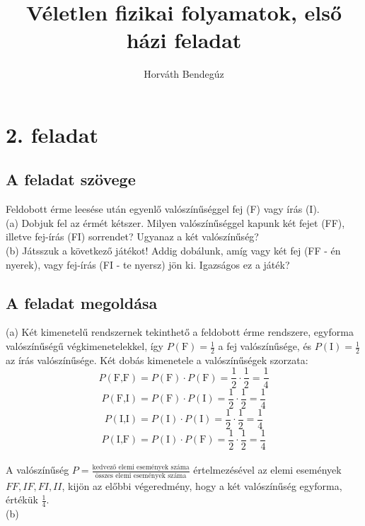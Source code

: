 \documentclass[12pt]{article}
\title{Véletlen fizikai folyamatok, első házi feladat}
\author{Horváth Bendegúz}
\begin{document}
 
 
\maketitle

\section*{2. feladat}
\subsection*{A feladat szövege}
Feldobott érme leesése után egyenlő valószínűséggel fej (F) vagy írás (I).
\\
(a) Dobjuk fel az érmét kétszer. Milyen valószínűséggel kapunk két fejet (FF), illetve fej-írás (FI) sorrendet? Ugyanaz a két valószínűség?
\\ 
(b) Játsszuk a következő játékot! Addig dobálunk, amíg vagy két fej (FF - én nyerek), vagy fej-írás (FI - te nyersz) jön ki. Igazságos ez a játék?
\subsection*{A feladat megoldása}
(a) Két kimenetelű rendszernek tekinthető a feldobott érme rendszere, egyforma valószínűségű végkimenetelekkel, így $P(\text{F}) = \frac{1}{2} $ a fej valószínűsége, és  $P(\text{I}) = \frac{1}{2} $ az írás valószínűsége. Két dobás kimenetele a valószínűségek szorzata: $$P(\text{F,F}) = P(\text{F})\cdot P(\text{F}) = \frac{1}{2}\cdot \frac{1}{2} = \frac{1}{4} $$
$$P(\text{F,I}) = P(\text{F})\cdot P(\text{I}) = \frac{1}{2}\cdot \frac{1}{2} = \frac{1}{4} $$
$$P(\text{I,I}) = P(\text{I})\cdot P(\text{I}) = \frac{1}{2}\cdot \frac{1}{2} = \frac{1}{4} $$
$$P(\text{I,F}) = P(\text{I})\cdot P(\text{F}) = \frac{1}{2}\cdot \frac{1}{2} = \frac{1}{4} $$
\\
A valószínűség $P = \frac{\text{kedvező elemi események száma}}{\text{összes elemi események száma}}$ értelmezésével az elemi események ${FF, IF, FI, II}$, kijön az előbbi végeredmény, hogy a két valószínűség egyforma, értékük $\frac{1}{4}$.\\
(b)
\end{document}
